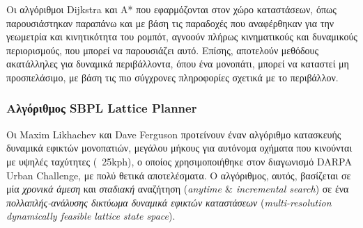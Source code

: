%

\bigskip
Οι αλγόριθμοι Dijkstra και A* που εφαρμόζονται στον χώρο καταστάσεων, όπως παρουσιάστηκαν παραπάνω και με βάση τις παραδοχές που αναφέρθηκαν για την γεωμετρία και κινητικότητα του ρομπότ, αγνοούν πλήρως κινηματικούς και δυναμικούς περιορισμούς, που μπορεί να παρουσιάζει αυτό. Επίσης, αποτελούν μεθόδους ακατάλληλες για δυναμικά περιβάλλοντα, όπου ένα μονοπάτι, μπορεί να καταστεί μη προσπελάσιμο, με βάση τις πιο σύγχρονες πληροφορίες σχετικά με το περιβάλλον.



\subsubsection{Αλγόριθμος SBPL Lattice Planner}
Οι Maxim Likhachev και Dave Ferguson \cite{sbpl} προτείνουν έναν αλγόριθμο κατασκευής δυναμικά εφικτών μονοπατιών, μεγάλου μήκους για αυτόνομα οχήματα που κινούνται με υψηλές ταχύτητες (~25kph), ο οποίος χρησιμοποιήθηκε στον διαγωνισμό DARPA Urban Challenge, με πολύ θετικά αποτελέσματα. Ο αλγόριθμος, αυτός, βασίζεται σε μία \textit{χρονικά άμεση} και \textit{σταδιακή} αναζήτηση (\textit{anytime $\&$ incremental search}) σε ένα \textit{πολλαπλής-ανάλυσης δικτύωμα δυναμικά εφικτών καταστάσεων} (\textit{multi-resolution dynamically feasible lattice state space}).

